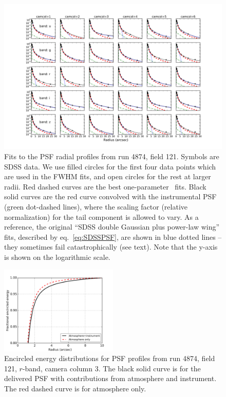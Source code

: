 \begin{figure}[tb]
\centering
\includegraphics[width=1.0\textwidth]{FIGURES/psffit.png}
\vskip -0.3in
\caption{Fits to the PSF radial profiles from run 4874, field
  121. Symbols are SDSS data. 
We use filled circles for the first four data points which are used in
the FWHM fits, and open circles for the rest at larger radii.
  Red dashed curves are the best one-parameter \vk~fits. Black solid curves are the red
  curve convolved with the instrumental PSF (green dot-dashed lines), where the scaling factor
  (relative normalization) 
  for the tail component is allowed to vary. 
As a reference, the original ``SDSS double Gaussian plus power-law wing'' fits,
described by eq.~\ref{eq:SDSSPSF}, 
 are shown in blue dotted lines -- they sometimes fail catastrophically (see text). 
Note that the y-axis is shown on the logarithmic scale.
\label{fig:psffit}}
\end{figure}


\begin{figure}[th]
\centering
\includegraphics[width=0.5\textwidth]{FIGURES/photometry.png}
\caption{Encircled energy distributions for PSF profiles from run
  4874, field 121, $r$-band, camera column 3. The black solid curve is
  for the delivered PSF with contributions from atmosphere and
  instrument.
The red dashed curve is for atmosphere only.
\label{fig:ee}}
\end{figure}
